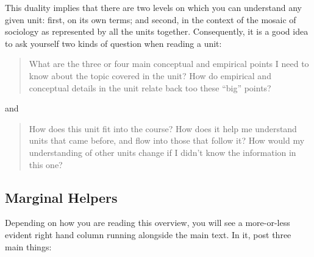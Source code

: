 \documentclass[
  letterpaper,
  DIV=11,
  numbers=noendperiod,
  oneside]{scrartcl}
\begin{document}
This duality implies that there are two levels on which you can
understand any given unit: first, on its own terms; and second, in the context of the mosaic of sociology as
represented by all the units together. Consequently, it is a good idea
to ask yourself two kinds of question when reading a unit:

\begin{quote}
What are the three or four main conceptual and empirical points I need
to know about the topic covered in the unit? How do empirical and
conceptual details in the unit relate back too these ``big'' points?
\end{quote}

and

\begin{quote}
How does this unit fit into the course? How does it help me understand
units that came before, and flow into those that follow it? How would my
understanding of other units change if I didn't know the information in
this one?
\end{quote}

\subsection{Marginal Helpers}\label{marginal-helpers}

Depending on how you are reading this overview, you will see a
more-or-less evident right hand column running alongside the main text.
In it, post three main things:

\end{document}
